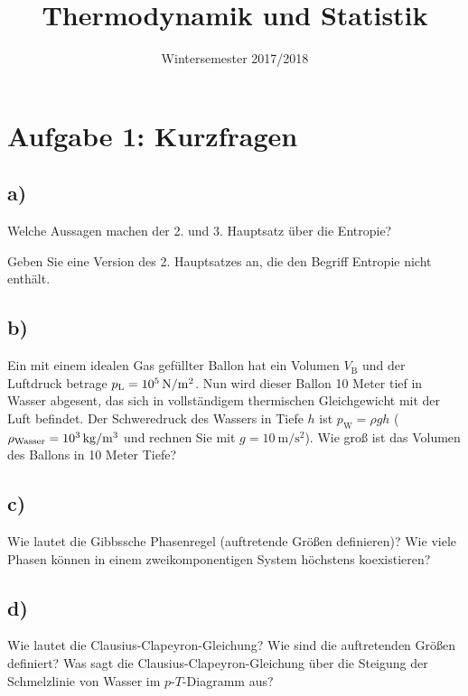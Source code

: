 

\subject{TuS}
\title{Thermodynamik und Statistik}
\date{
    Wintersemester 2017/2018
}



\maketitle
\thispagestyle{empty}
\newpage


\section{Aufgabe 1: Kurzfragen}
\subsection{a)}
Welche Aussagen machen der 2. und 3. Hauptsatz über die Entropie?

Geben Sie eine Version des 2. Hauptsatzes an, die den Begriff Entropie nicht enthält.

\subsection{b)}
Ein mit einem idealen Gas gefüllter Ballon hat ein Volumen $V_\text{B}$ und der Luftdruck betrage $p_\text{L} = \SI{E5}{\newton\per\square\meter}$.
Nun wird dieser Ballon 10 Meter tief in Wasser abgesent, das sich in vollständigem thermischen Gleichgewicht mit der Luft befindet. 
Der Schweredruck des Wassers in Tiefe $h$ ist $p_\text{W} = \rho g h$ ($\rho_\text{Wasser} = \SI{E3}{\kilogram\per\cubic\meter}$ und rechnen Sie mit $g = \SI{10}{\meter\per\square\second}$).
Wie groß ist das Volumen des Ballons in 10 Meter Tiefe?

\subsection{c)}
Wie lautet die Gibbssche Phasenregel (auftretende Größen definieren)?
Wie viele Phasen können in einem zweikomponentigen System höchstens koexistieren?

\subsection{d)}
Wie lautet die Clausius-Clapeyron-Gleichung? 
Wie sind die auftretenden Größen definiert?
Was sagt die Clausius-Clapeyron-Gleichung über die Steigung der Schmelzlinie von Wasser im $p$-$T$-Diagramm aus?


